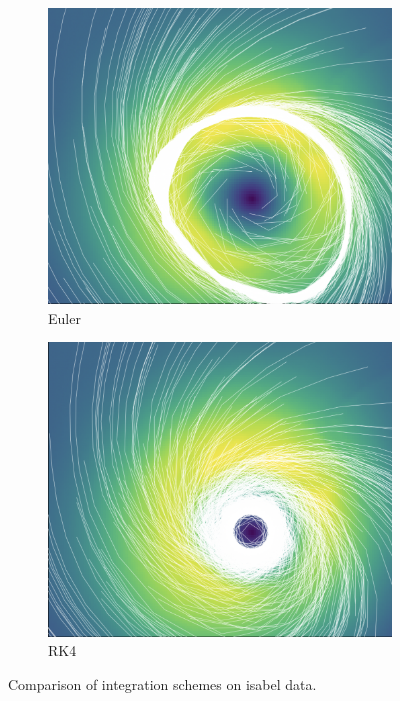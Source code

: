 \documentclass{article}
\begin{document}
\begin{figure}[h!]
    \centering
    \begin{subfigure}{0.48\textwidth}
        \centering
        \includegraphics[width=\textwidth, angle=0]{euler.png}
        \caption{Euler}
    \end{subfigure}
    \hfill
    \begin{subfigure}{0.48\textwidth}
        \centering
        \includegraphics[width=\textwidth, angle=0]{rk4.png}
        \caption{RK4}
    \end{subfigure}
    \caption{Comparison of integration schemes on isabel data.}
\end{figure}
\end{document}
